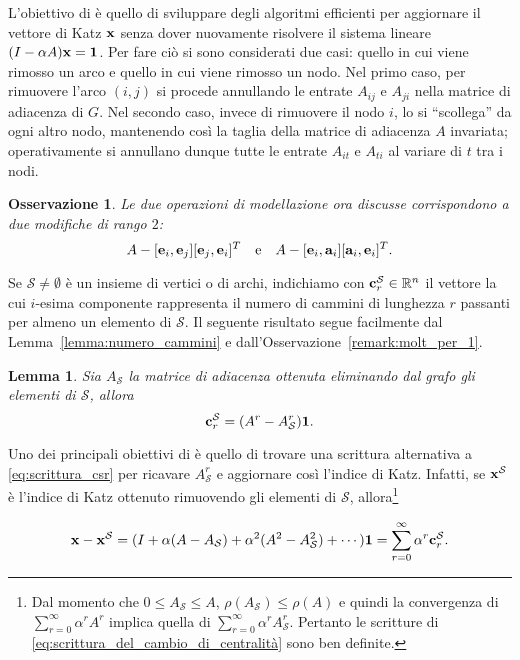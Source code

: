 \documentclass[a4paper]{article}
\newcommand{\RR}{\mathbb{R}}
\newcommand{\evec}{{\bf e}}
\newcommand{\cvec}{{\bf c}}
\newcommand{\avec}{{\bf a}}
\newcommand{\xvec}{{\bf x}}
\newcommand{\bone}{\mathbf{1}}
\newcommand{\cS}{\mathcal{S}}
\newtheorem{lemma}{Lemma}
\newtheorem{remark}{Osservazione}
\begin{document}
L'obiettivo di \cite{katz2024} è quello di sviluppare degli algoritmi efficienti per aggiornare il vettore di Katz $\xvec$ senza dover nuovamente
risolvere il sistema lineare $(I-\alpha A)\xvec = \bone$. Per fare ciò
si sono considerati due casi: quello in cui viene rimosso un arco e quello
in cui viene rimosso un nodo. Nel primo caso, per rimuovere l'arco $(i, j)$
si procede annullando le entrate $A_{ij}$ e $A_{ji}$ nella matrice di
adiacenza di $G$. Nel secondo caso, invece di rimuovere il nodo $i$, lo
si ``scollega'' da ogni altro nodo, mantenendo così la taglia della matrice
di adiacenza $A$ invariata; operativamente si annullano dunque tutte le
entrate $A_{it}$ e $A_{ti}$ al variare di $t$ tra i nodi.

\begin{remark} \label{remark:ops}
	Le due operazioni di modellazione ora discusse corrispondono a due modifiche di rango $2$:
	\[
		A - [\evec_i, \evec_j] [\evec_j, \evec_i]^T  \quad \text{e} \quad A - [\evec_i, \avec_i] [\avec_i, \evec_i]^T.
	\]
\end{remark}

Se $\cS \neq \emptyset$ è un insieme di vertici o di archi, indichiamo
con $\cvec^\cS_r \in \RR^n$ il vettore la cui $i$-esima componente
rappresenta il numero di cammini di lunghezza $r$ passanti per almeno
un elemento di $\cS$. Il seguente risultato segue facilmente dal Lemma~\ref{lemma:numero_cammini} e
dall'Osservazione~\ref{remark:molt_per_1}.

\begin{lemma}
	Sia $A_\cS$ la matrice di
	adiacenza ottenuta eliminando dal grafo gli elementi di $\cS$, allora
	\begin{equation} \label{eq:scrittura_csr}
		\cvec^\cS_r = (A^r - A_\cS^r)\bone.
	\end{equation}
\end{lemma}

Uno dei principali obiettivi di \cite{katz2024} è quello di trovare
una scrittura alternativa a \eqref{eq:scrittura_csr} per ricavare
$A_\cS^r$ e aggiornare così l'indice di Katz. Infatti, se $\xvec^\cS$ è
l'indice di Katz ottenuto rimuovendo gli elementi di $\cS$, allora\footnote{Dal momento che $0 \leq A_\cS \leq A$, $\rho (A_\cS) \leq \rho(A)$ \cite{horn1985} e quindi la convergenza di $\sum_{r=0}^\infty \alpha^r A^r$ implica
	quella di $\sum_{r=0}^\infty \alpha^r A_\cS^r$. Pertanto le scritture di \eqref{eq:scrittura_del_cambio_di_centralità} sono ben definite.}

\begin{equation} \label{eq:scrittura_del_cambio_di_centralità}
	\xvec - \xvec^\cS = (I + \alpha (A - A_\cS) + \alpha^2(A^2 - A_\cS^2)+ \cdots) \bone = \sum_{r=0}^\infty \alpha^r \cvec^\cS_r.
\end{equation}
\end{document}
